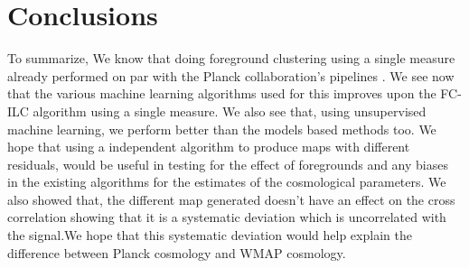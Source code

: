 \chapter{ Conclusions}
\label{conc}
      To summarize, We know that doing foreground clustering using a single measure already
performed on par with the Planck collaboration's pipelines \cite{datarishi}.
We see now that the various machine learning algorithms used for this improves upon the FC-ILC
algorithm using a single measure. 
We also see that, using unsupervised machine learning, we 
perform better than the models based methods \cite{lilrishi} 
too. 
We hope that using a independent algorithm to produce maps with
different residuals, would be useful in testing for the effect of foregrounds and any biases in
the existing algorithms for the estimates of the cosmological parameters. 
We also showed that, the different map generated doesn't have 
an effect on the cross correlation showing that it is a 
systematic deviation which is uncorrelated with the signal.We 
hope that this systematic deviation would help explain the 
difference between Planck cosmology and WMAP cosmology. 




